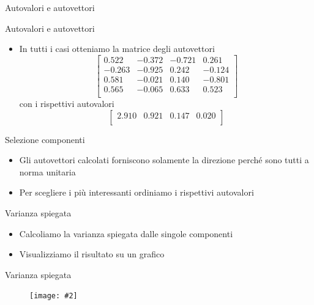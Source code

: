 \documentclass[xcolor={dvipsnames}]{beamer}
\newcommand{\codice}[2]{}
\newcommand{\figcen}[2]{
	\begin{figure}
		\begin{center}
			\texttt{[image: \#2]}
		\end{center}
	\end{figure}
}
\begin{document}
		\begin{frame}{Autovalori e autovettori}
			\codice{61}{82}
		\end{frame}
	
		\begin{frame}{Autovalori e autovettori}
			\codice{84}{94}
			\begin{spacing}{0.8}
				\begin{itemize}
					\item In tutti i casi otteniamo la matrice degli autovettori 
						{
							\small
							$$\begin{bmatrix}
								0.522 & -0.372 & -0.721 & 0.261\\
								-0.263 & -0.925 & 0.242 & -0.124\\
								0.581 & -0.021 & 0.140 & -0.801\\
								0.565 & -0.065 & 0.633 & 0.523\\
							\end{bmatrix}$$
						}
						con i rispettivi autovalori
						{
							\small
							$$\begin{bmatrix}
								2.910 & 0.921 & 0.147 & 0.020\\
							\end{bmatrix}$$
						}						
				\end{itemize}
			\end{spacing}
		\end{frame}
	
		\begin{frame}{Selezione componenti}
			\begin{itemize}
				\item Gli autovettori calcolati forniscono solamente la direzione perché sono tutti a norma unitaria
				\item Per scegliere i più interessanti ordiniamo i rispettivi autovalori
			\end{itemize}
			\codice{96}{102}
		\end{frame}

		\begin{frame}{Varianza spiegata}
			\begin{itemize}
				\item Calcoliamo la varianza spiegata dalle singole componenti
				\item Visualizziamo il risultato su un grafico
			\end{itemize}
			\codice{108}{123}
		\end{frame}

		\begin{frame}{Varianza spiegata}
			\figcen{.75\textwidth}{istoVarianza}
		\end{frame}
	
\end{document}
